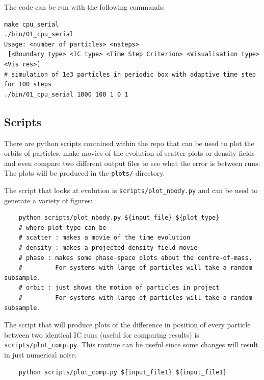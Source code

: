 \par 
The code can be run with the following commands: 
\begin{center}
\begin{minipage}{0.95\textwidth}
\small
\begin{verbatim}
make cpu_serial
./bin/01_cpu_serial 
Usage: <number of particles> <nsteps>
 [<Boundary type> <IC type> <Time Step Criterion> <Visualisation type> <Vis res>]
# simulation of 1e3 particles in periodic box with adaptive time step for 100 steps  
./bin/01_cpu_serial 1000 100 1 0 1  
\end{verbatim}
\end{minipage}
\end{center}

\subsection{Scripts}
There are python scripts contained within the repo that can be used to plot the orbits of particles, make movies of the evolution of scatter plots or density fields and even compare two different output files to see what the error is between runs. The plots will be produced in the \texttt{plots/} directory.

\par 
The script that looks at evolution is \texttt{scripts/plot\_nbody.py} and can be used to generate a variety of figures:
\begin{center}
\begin{minipage}{0.95\textwidth}
\small
\begin{verbatim}
    python scripts/plot_nbody.py ${input_file} ${plot_type} 
    # where plot type can be 
    # scatter : makes a movie of the time evolution
    # density : makes a projected density field movie
    # phase : makes some phase-space plots about the centre-of-mass. 
    #         For systems with large of particles will take a random subsample.
    # orbit : just shows the motion of particles in project 
    #         For systems with large of particles will take a random subsample.
\end{verbatim}
\end{minipage}
\end{center}
    
\par 
The script that will produce plots of the difference in position of every particle between two identical IC runs (useful for comparing results) is \texttt{scripts/plot\_comp.py}. This routine can be useful since some changes will result in just numerical noise. 
\begin{center}
\begin{minipage}{0.95\textwidth}
\small
\begin{verbatim}
    python scripts/plot_comp.py ${input_file1} ${input_file1}  
\end{verbatim}
\end{minipage}
\end{center}


